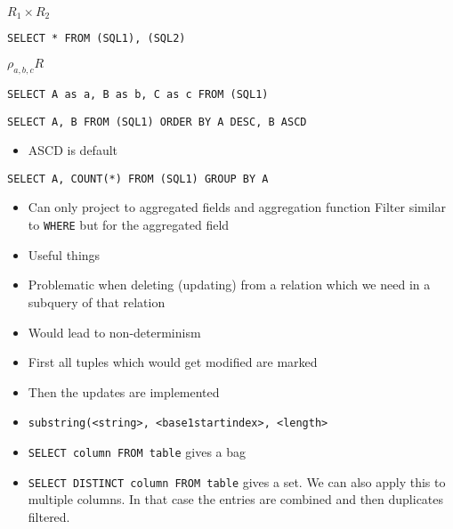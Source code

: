 \begin{itemize}
\begin{itemize}
             $R_1 \times R_2$
\begin{verbatim}
SELECT * FROM (SQL1), (SQL2)
\end{verbatim}
             $\rho_{a, b, c}R$
\begin{verbatim}
SELECT A as a, B as b, C as c FROM (SQL1)
\end{verbatim}
        \end{itemize}
\begin{verbatim}
SELECT A, B FROM (SQL1) ORDER BY A DESC, B ASCD
\end{verbatim}
        \begin{itemize}
            \item ASCD is default
        \end{itemize}
\begin{verbatim}
SELECT A, COUNT(*) FROM (SQL1) GROUP BY A
\end{verbatim}
        \begin{itemize}
            \item Can only project to aggregated fields and aggregation function
                 Filter similar to \verb+WHERE+ but for the aggregated field
        \end{itemize}
        \begin{itemize}
            \item Useful things
        \end{itemize}
        \begin{itemize}
            \item Problematic when deleting (updating) from a relation which we need in a subquery of that relation
            \item Would lead to non-determinism
            \item First all tuples which would get modified are marked
            \item Then the updates are implemented
        \end{itemize}
\end{itemize}

\begin{itemize}
    \item \verb+substring(<string>, <base1startindex>, <length>+
    \item \verb+SELECT column FROM table+ gives a bag
    \item \verb+SELECT DISTINCT column FROM table+ gives a set. We can also apply this to multiple columns. In that case the entries are combined and then duplicates filtered.
\end{itemize}

